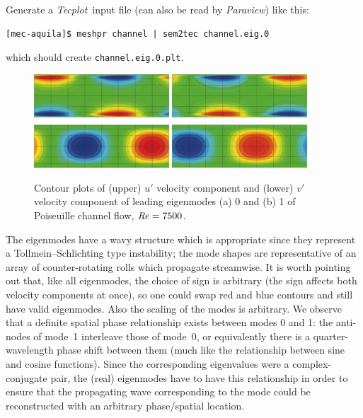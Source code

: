 \documentclass[11pt,a4paper]{report}
\newcommand\Rey{\mbox{\textit{Re}}}
\newcommand{\Tecplot}{\emph{Tecplot}}
\newcommand{\Paraview}{\emph{Paraview}}
\begin{document}
Generate a \Tecplot\ input file (can also be read by \Paraview)
like this:
\begin{verbatim}
[mec-aquila]$ meshpr channel | sem2tec channel.eig.0
\end{verbatim}
\noindent which should create \verb+channel.eig.0.plt+.

\begin{figure}
\begin{center}
\includegraphics[width=0.45\textwidth]{export0.pdf}
\includegraphics[width=0.45\textwidth]{export1.pdf}
\end{center}
\caption{Contour plots of (upper) $u'$ velocity component and (lower)
  $v'$ velocity component of leading eigenmodes (a) 0 and (b) 1 of
  Poiseuille channel flow, $\Rey=7500$.}
\label{fig.chanmodes}
\end{figure}

The eigenmodes have a wavy structure which is appropriate since they
represent a Tollmein--Schlichting type instability; the mode shapes
are representative of an array of counter-rotating rolls which
propagate streamwise.  It is worth pointing out that, like all
eigenmodes, the choice of sign is arbitrary (the sign affects both
velocity components at once), so one could swap red and blue contours
and still have valid eigenmodes.  Also the scaling of the modes is
arbitrary.  We observe that a definite spatial phase relationship
exists between modes 0 and 1: the anti-nodes of mode~1 interleave those
of mode~0, or equivalently there is a quarter-wavelength phase shift
between them (much like the relationship between sine and cosine
functions).  Since the corresponding eigenvalues were a
complex-conjugate pair, the (real) eigenmodes have to have this
relationship in order to ensure that the propagating wave
corresponding to the mode could be reconstructed with an arbitrary
phase/spatial location.
\end{document}
